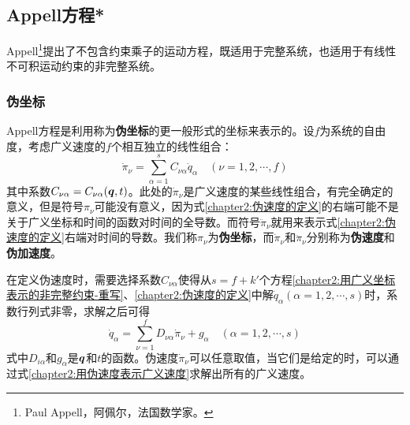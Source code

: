 

\subsection{Appell方程*}

Appell\footnote{Paul Appell，阿佩尔，法国数学家。}提出了不包含约束乘子的运动方程，既适用于完整系统，也适用于有线性不可积运动约束的非完整系统。

\subsubsection{伪坐标}

Appell方程是利用称为{\bf 伪坐标}的更一般形式的坐标来表示的。设$f$为系统的自由度，考虑广义速度的$f$个相互独立的线性组合：
\begin{equation}
	\dot{\pi}_\nu = \sum_{\alpha=1}^s C_{\nu\alpha} \dot{q}_\alpha \quad (\nu=1,2,\cdots,f)
	\label{chapter2:伪速度的定义}
\end{equation}
其中系数$C_{\nu\alpha}=C_{\nu\alpha}(\boldsymbol{q},t)$。此处的$\dot{\pi}_\nu$是广义速度的某些线性组合，有完全确定的意义，但是符号$\pi_\nu$可能没有意义，因为式\eqref{chapter2:伪速度的定义}的右端可能不是关于广义坐标和时间的函数对时间的全导数。而符号$\ddot{\pi}_\nu$就用来表示式\eqref{chapter2:伪速度的定义}右端对时间的导数。我们称$\pi_\nu$为{\bf 伪坐标}，而$\dot{\pi}_\nu$和$\ddot{\pi}_\nu$分别称为{\bf 伪速度}和{\bf 伪加速度}。

在定义伪速度时，需要选择系数$C_{\nu\alpha}$使得从$s=f+k'$个方程\eqref{chapter2:用广义坐标表示的非完整约束-重写}、\eqref{chapter2:伪速度的定义}中解$\dot{q}_\alpha(\alpha=1,2,\cdots,s)$时，系数行列式非零，求解之后可得
\begin{equation}
	\dot{q}_\alpha = \sum_{\nu=1}^f D_{\nu\alpha}\dot{\pi}_\nu+g_\alpha\quad (\alpha=1,2,\cdots,s)
	\label{chapter2:用伪速度表示广义速度}
\end{equation}
式中$D_{i\alpha}$和$g_\alpha$是$\boldsymbol{q}$和$t$的函数。伪速度$\dot{\pi}_\nu$可以任意取值，当它们是给定的时，可以通过式\eqref{chapter2:用伪速度表示广义速度}求解出所有的广义速度。

